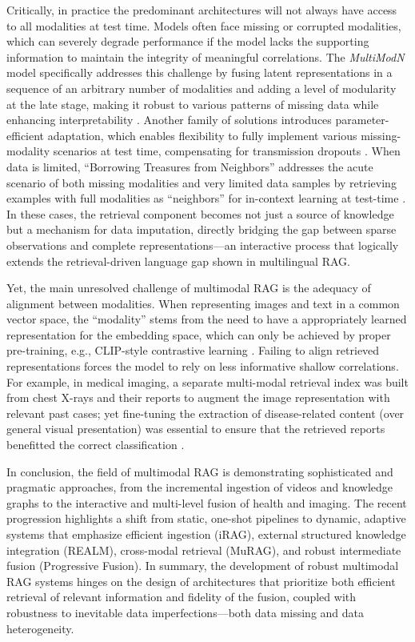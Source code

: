 \documentclass[11pt]{article}
\begin{document}
Critically, in practice the predominant architectures will not always have access to all modalities at test time. Models often face missing or corrupted modalities, which can severely degrade performance if the model lacks the supporting information to maintain the integrity of meaningful correlations. The \emph{MultiModN} model specifically addresses this challenge by fusing latent representations in a sequence of an arbitrary number of modalities and adding a level of modularity at the late stage, making it robust to various patterns of missing data while enhancing interpretability \cite{ref365}. Another family of solutions introduces parameter-efficient adaptation, which enables flexibility to fully implement various missing-modality scenarios at test time, compensating for transmission dropouts \cite{ref366}. When data is limited, ``Borrowing Treasures from Neighbors'' addresses the acute scenario of both missing modalities and very limited data samples by retrieving examples with full modalities as ``neighbors'' for in-context learning at test-time \cite{ref367}. In these cases, the retrieval component becomes not just a source of knowledge but a mechanism for data imputation, directly bridging the gap between sparse observations and complete representations---an interactive process that logically extends the retrieval-driven language gap shown in multilingual RAG.

Yet, the main unresolved challenge of multimodal RAG is the adequacy of alignment between modalities. When representing images and text in a common vector space, the ``modality'' stems from the need to have a appropriately learned representation for the embedding space, which can only be achieved by proper pre-training, e.g., CLIP-style contrastive learning \cite{ref368}. Failing to align retrieved representations forces the model to rely on less informative shallow correlations. For example, in medical imaging, a separate multi-modal retrieval index was built from chest X-rays and their reports to augment the image representation with relevant past cases; yet fine-tuning the extraction of disease-related content (over general visual presentation) was essential to ensure that the retrieved reports benefitted the correct classification \cite{ref369}.

In conclusion, the field of multimodal RAG is demonstrating sophisticated and pragmatic approaches, from the incremental ingestion of videos and knowledge graphs to the interactive and multi-level fusion of health and imaging. The recent progression highlights a shift from static, one-shot pipelines to dynamic, adaptive systems that emphasize efficient ingestion (iRAG), external structured knowledge integration (REALM), cross-modal retrieval (MuRAG), and robust intermediate fusion (Progressive Fusion). In summary, the development of robust multimodal RAG systems hinges on the design of architectures that prioritize both efficient retrieval of relevant information and fidelity of the fusion, coupled with robustness to inevitable data imperfections---both data missing and data heterogeneity.
\end{document}
